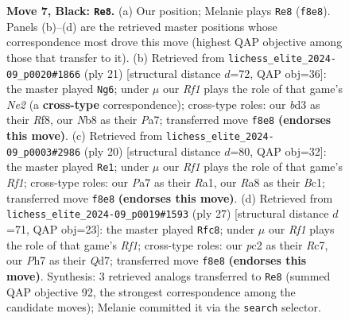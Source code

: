 \documentclass[11pt]{article}
\begin{document}
\begin{figure}[p]
\caption{\textbf{Move 7, Black: \texttt{Re8}.} (a) Our position; Melanie plays \texttt{Re8} (\texttt{f8e8}). Panels (b)--(d) are the retrieved master positions whose correspondence most drove this move (highest QAP objective among those that transfer to it). (b) Retrieved from \texttt{lichess\_elite\_2024-09\_p0020\#1866} (ply 21) [structural distance $d$=72, QAP obj=36]: the master played \texttt{Ng6}; under $\mu$ our \emph{Rf1} plays the role of that game's \emph{Ne2} (a \textbf{cross-type} correspondence); cross-type roles: our \emph{b}d3 as their \emph{R}f8, our \emph{N}b8 as their \emph{P}a7; transferred move \texttt{f8e8} \textbf{(endorses this move)}. (c) Retrieved from \texttt{lichess\_elite\_2024-09\_p0003\#2986} (ply 20) [structural distance $d$=80, QAP obj=32]: the master played \texttt{Re1}; under $\mu$ our \emph{Rf1} plays the role of that game's \emph{Rf1}; cross-type roles: our \emph{P}a7 as their \emph{R}a1, our \emph{R}a8 as their \emph{B}c1; transferred move \texttt{f8e8} \textbf{(endorses this move)}. (d) Retrieved from \texttt{lichess\_elite\_2024-09\_p0019\#1593} (ply 27) [structural distance $d$=71, QAP obj=23]: the master played \texttt{Rfc8}; under $\mu$ our \emph{Rf1} plays the role of that game's \emph{Rf1}; cross-type roles: our \emph{p}c2 as their \emph{R}c7, our \emph{P}h7 as their \emph{Q}d7; transferred move \texttt{f8e8} \textbf{(endorses this move)}. Synthesis: 3 retrieved analogs transferred to \texttt{Re8} (summed QAP objective 92, the strongest correspondence among the candidate moves); Melanie committed it via the \texttt{search} selector.}
\label{fig:thought-m13}
\end{figure}

\clearpage
\end{document}
